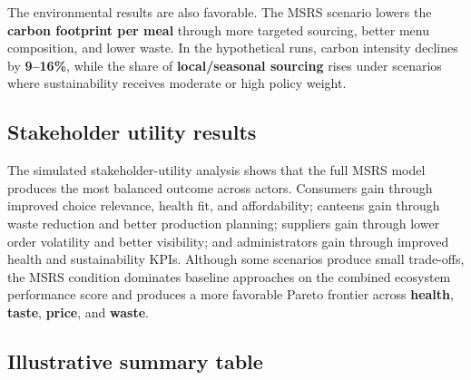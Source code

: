\documentclass[
  letterpaper,
  DIV=11,
  numbers=noendperiod]{scrartcl}
\begin{document}
The environmental results are also favorable. The MSRS scenario lowers
the \textbf{carbon footprint per meal} through more targeted sourcing,
better menu composition, and lower waste. In the hypothetical runs,
carbon intensity declines by \textbf{9--16\%}, while the share of
\textbf{local/seasonal sourcing} rises under scenarios where
sustainability receives moderate or high policy weight.

\subsection{Stakeholder utility
results}\label{stakeholder-utility-results}

The simulated stakeholder-utility analysis shows that the full MSRS
model produces the most balanced outcome across actors. Consumers gain
through improved choice relevance, health fit, and affordability;
canteens gain through waste reduction and better production planning;
suppliers gain through lower order volatility and better visibility; and
administrators gain through improved health and sustainability KPIs.
Although some scenarios produce small trade-offs, the MSRS condition
dominates baseline approaches on the combined ecosystem performance
score and produces a more favorable Pareto frontier across
\textbf{health}, \textbf{taste}, \textbf{price}, and \textbf{waste}.

\subsection{Illustrative summary
table}\label{illustrative-summary-table}
\end{document}

